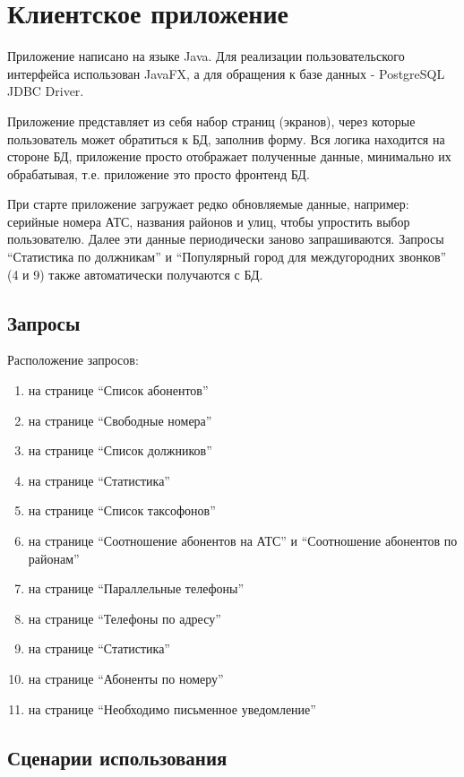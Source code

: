 \documentclass{report}
\begin{document}
\chapter{Клиентское приложение}

Приложение написано на языке Java. Для реализации пользовательского
интерфейса использован JavaFX, а для обращения к базе 
данных - PostgreSQL JDBC Driver.

Приложение представляет из себя набор страниц (экранов), 
через которые пользователь может обратиться к БД, 
заполнив форму. Вся логика находится на стороне БД, 
приложение просто отображает полученные данные, минимально
их обрабатывая, т.е. приложение это просто фронтенд БД.

При старте приложение загружает редко обновляемые данные, 
например: серийные номера АТС, названия районов и улиц, 
чтобы упростить выбор пользователю. 
Далее эти данные периодически заново запрашиваются.
Запросы ``Статистика по должникам'' и 
``Популярный город для междугородних звонков'' (4 и 9) 
также автоматически получаются с БД.

\section{Запросы}

Расположение запросов:
\begin{enumerate}
    \item на странице ``Список абонентов''
    \item на странице ``Свободные номера''
    \item на странице ``Список должников''
    \item на странице ``Статистика''
    \item на странице ``Список таксофонов''
    \item на странице ``Соотношение абонентов на АТС'' и ``Соотношение абонентов по районам''
    \item на странице ``Параллельные телефоны''
    \item на странице ``Телефоны по адресу''
    \item на странице ``Статистика''
    \item на странице ``Абоненты по номеру''
    \item на странице ``Необходимо письменное уведомление''
\end{enumerate}

\section{Сценарии использования}
\end{document}
